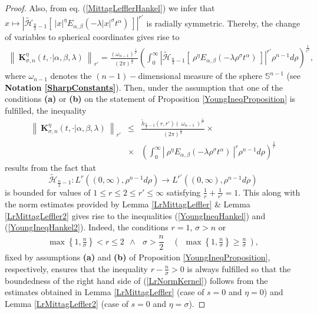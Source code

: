 \documentclass{amsart}
\theoremstyle{definition}
\theoremstyle{remark}
\numberwithin{equation}{section}
\begin{document}
\begin{proof}
	Also, from eq. (\ref{MittagLefflerHankel}) we infer that $x\mapsto \left|\widetilde{\mathcal{H}}_{\frac{n}{2}-1}\left[~|x|^\eta E_{\alpha,\beta}\left(-\lambda |x|^\sigma t^{\alpha}\right)~\right]\right|^{r'}$ is radially symmetric. Thereby, the change of variables to spherical coordinates gives rise to 
	\begin{eqnarray*}
		\left\| ~{\bm K}_{\sigma,n}^\eta(t,\cdot|\alpha,\beta,\lambda)~\right\|_{r'}=\frac{\left(\omega_{n-1}\right)^{\frac{1}{r'}}}{(2\pi)^{\frac{n}{2}}}\left(\int_{0}^\infty \left|\widetilde{\mathcal{H}}_{\frac{n}{2}-1}\left[~\rho^\eta E_{\alpha,\beta}\left(-\lambda \rho^\sigma t^{\alpha}\right)~\right]\right|^{r'} \rho^{n-1}d\rho\right)^{\frac{1}{r'}},
	\end{eqnarray*}
	where $\displaystyle \omega_{n-1}$ denotes the $(n-1)-$dimensional measure of the sphere $\mathbb{S}^{n-1}$ (see {\bf Notation \ref{SharpConstants}}). 
	Then, under the assumption that one of the conditions {\bf (a)} or {\bf (b)} on the statement of Proposition \ref{YoungIneqProposition} is fulfilled, the inequality
	\begin{eqnarray}
		\label{LrNormKernel}\left\| ~{\bm K}_{\sigma,n}^\eta(t,\cdot|\alpha,\beta,\lambda)~\right\|_{r'}&\leq& \frac{\widetilde{h}_{\frac{n}{2}-1}(r,r')\left(~\omega_{n-1}~\right)^{\frac{1}{r'}}}{(2\pi)^{\frac{n}{2}}}\times \nonumber\\ &\times& \left(\int_0^\infty\left|~\rho^{\eta}E_{\alpha,\beta}(-\lambda \rho^\sigma t^{\alpha})~\right|^r\rho^{n-1}d\rho\right)^{\frac{1}{r}}	
	\end{eqnarray}
	results from the fact that $$\widetilde{\mathcal{H}}_{\frac{n}{2}-1}:L^r((0,\infty),\rho^{n-1}d\rho)\rightarrow L^{r'}((0,\infty),\rho^{n-1}d\rho)$$ is bounded for values of $1\leq r\leq 2\leq r'\leq \infty$ satisfying $\displaystyle \frac{1}{r}+\frac{1}{r'}=1$.
	This along with the norm estimates provided by Lemma \ref{LrMittagLeffler} \& Lemma \ref{LrMittagLeffler2} gives rise to the inequalities (\ref{YoungIneqHankel}) and (\ref{YoungIneqHankel2}). Indeed, the conditions $r=1$, $\sigma>n$ or
	\begin{eqnarray*}
		\displaystyle  \max\left\{1,\frac{n}{\sigma}\right\}<r\leq 2 ~~\wedge~~~\displaystyle \sigma >\dfrac{n}{2} ~&\left(~\displaystyle ~\max\left\{1,\frac{n}{\sigma}\right\}\geq \frac{n}{\sigma}~\right),
	\end{eqnarray*} fixed by assumptions {\bf (a)} and {\bf (b)} of Proposition \ref{YoungIneqProposition}, respectively, ensures that the inequality $\displaystyle r-\frac{n}{\sigma}>0$ is always fulfilled so that the boundedness of the right hand side of (\ref{LrNormKernel}) follows from the estimates obtained in Lemma \ref{LrMittagLeffler} (case of $s=0$ and $\eta=0$) and Lemma \ref{LrMittagLeffler2} (case of $s=0$ and $\eta=\sigma$).
\end{proof}
\end{document}
